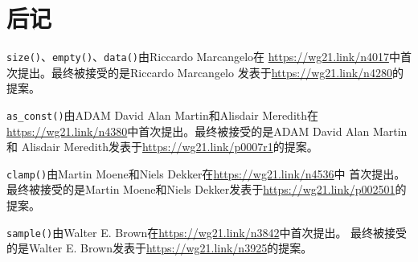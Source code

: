 \section{后记}
\texttt{size()}、\texttt{empty()}、\texttt{data()}由Riccardo Marcangelo在
\url{https://wg21.link/n4017}中首次提出。最终被接受的是Riccardo Marcangelo
发表于\url{https://wg21.link/n4280}的提案。

\texttt{as\_const()}由ADAM David Alan Martin和Alisdair Meredith在
\url{https://wg21.link/n4380}中首次提出。最终被接受的是ADAM David Alan Martin和
Alisdair Meredith发表于\url{https://wg21.link/p0007r1}的提案。

\texttt{clamp()}由Martin Moene和Niels Dekker在\url{https://wg21.link/n4536}中
首次提出。最终被接受的是Martin Moene和Niels Dekker发表于\url{https://wg21.link/p002501}的提案。

\texttt{sample()}由Walter E. Brown在\url{https://wg21.link/n3842}中首次提出。
最终被接受的是Walter E. Brown发表于\url{https://wg21.link/n3925}的提案。